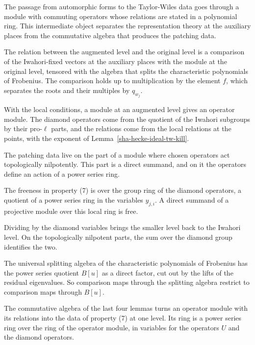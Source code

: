 The passage from automorphic forms to the Taylor-Wiles data goes through a module with commuting operators whose relations are stated in a polynomial ring. This intermediate object separates the representation theory at the auxiliary places from the commutative algebra that produces the patching data.

The relation between the augmented level and the original level is a comparison of the Iwahori-fixed vectors at the auxiliary places with the module at the original level, tensored with the algebra that splits the characteristic polynomials of Frobenius. The comparison holds up to multiplication by the element $f$, which separates the roots and their multiples by $q_{w_j}$.

With the local conditions, a module at an augmented level gives an operator module. The diamond operators come from the quotient of the Iwahori subgroups by their pro-$\ell$ parts, and the relations come from the local relations at the points, with the exponent of Lemma~\ref{sha-hecke-ideal-tw-kill}.

The patching data live on the part of a module where chosen operators act topologically nilpotently. This part is a direct summand, and on it the operators define an action of a power series ring.

The freeness in property (7) is over the group ring of the diamond operators, a quotient of a power series ring in the variables $y_{j,i}$. A direct summand of a projective module over this local ring is free.

Dividing by the diamond variables brings the smaller level back to the Iwahori level. On the topologically nilpotent parts, the sum over the diamond group identifies the two.

The universal splitting algebra of the characteristic polynomials of Frobenius has the power series quotient $B[u]$ as a direct factor, cut out by the lifts of the residual eigenvalues. So comparison maps through the splitting algebra restrict to comparison maps through $B[u]$.

The commutative algebra of the last four lemmas turns an operator module with its relations into the data of property (7) at one level. Its ring is a power series ring over the ring of the operator module, in variables for the operators $U$ and the diamond operators.

